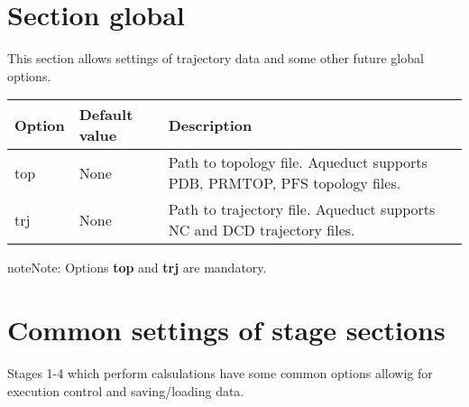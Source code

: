 \documentclass[a4paper,10pt,english]{sphinxmanual}
\begin{document}
\section{Section \textbf{global}}
\label{valve/valve_config:section-global}
This section allows settings of trajectory data and some other future global options.

\noindent\begin{tabulary}{\linewidth}{|L|L|L|}
\hline
\textsf{\relax 
Option
\unskip}\relax &\textsf{\relax 
Default value
\unskip}\relax &\textsf{\relax 
Description
\unskip}\relax \\
\hline
top
&
None
&
Path to topology file. Aqueduct supports PDB, PRMTOP, PFS topology files.
\\
\hline
trj
&
None
&
Path to trajectory file. Aqueduct supports NC and DCD trajectory files.
\\
\hline\end{tabulary}


\begin{notice}{note}{Note:}
Options \textbf{top} and \textbf{trj} are mandatory.
\end{notice}


\section{Common settings of stage sections}
\label{valve/valve_config:common-settings-of-stage-sections}
Stages 1-4 which perform calsulations have some common options allowig for execution control and saving/loading data.
\end{document}
